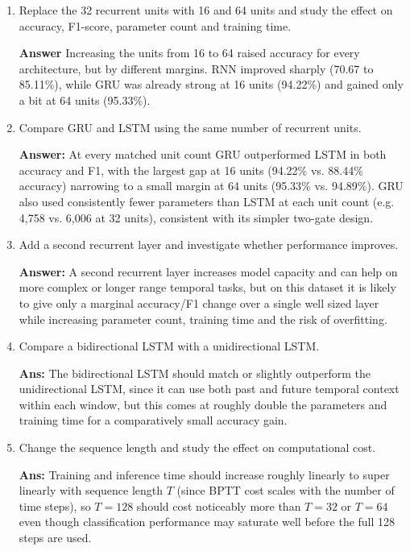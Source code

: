\documentclass[10pt]{article}
\begin{document}
\begin{enumerate}

\item Replace the 32 recurrent units with 16 and 64 units and study the effect
on accuracy, F1-score, parameter count and training time.

\textbf{Answer} Increasing the units from 16 to 64 raised accuracy for
every architecture, but by different margins. RNN improved sharply
(70.67 to 85.11\%), while GRU was already strong at 16 units
(94.22\%) and gained only a bit at 64 units (95.33\%). 

\item Compare GRU and LSTM using the same number of recurrent units.

\textbf{Answer:} At every matched unit count GRU outperformed LSTM in
both accuracy and F1, with the largest gap at 16 units
(94.22\% vs. 88.44\% accuracy) narrowing to a small margin at 64 units
(95.33\% vs. 94.89\%). GRU also used consistently fewer parameters than LSTM
at each unit count (e.g. 4{,}758 vs. 6{,}006 at 32 units), consistent with
its simpler two-gate design.

\item Add a second recurrent layer and investigate whether performance
improves.

\textbf{Answer:} A second recurrent layer increases model capacity
and can help on more complex or longer range temporal tasks, but on this
dataset it is likely to give only a marginal accuracy/F1 change over a
single well sized layer while increasing parameter count, training time and
the risk of overfitting.

\item Compare a bidirectional LSTM with a unidirectional LSTM.

\textbf{Ans:} The bidirectional LSTM should match or slightly
outperform the unidirectional LSTM, since it can use both past and future
temporal context within each window, but this comes at roughly double the
parameters and training time for a comparatively small accuracy gain.

\item Change the sequence length and study the effect on computational cost.

\textbf{Ans:} Training and inference time should increase
roughly linearly to super linearly with sequence length $T$ (since BPTT
cost scales with the number of time steps), so $T=128$ should cost
noticeably more than $T=32$ or $T=64$ even though classification
performance may saturate well before the full 128 steps are used.


\end{enumerate}
\end{document}
